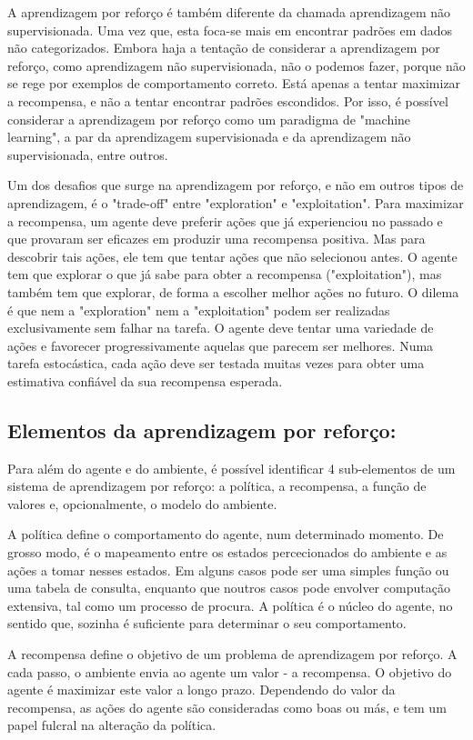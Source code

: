 A aprendizagem por reforço é também diferente da chamada aprendizagem não supervisionada. Uma vez que, esta foca-se mais em encontrar padrões em dados não categorizados. Embora haja a tentação de considerar a aprendizagem por reforço, como aprendizagem não supervisionada, não o podemos fazer, porque não se rege por exemplos de comportamento correto. Está apenas a tentar maximizar a recompensa, e não a tentar encontrar padrões escondidos.
Por isso, é possível considerar a aprendizagem por reforço como um paradigma de "machine learning", a par da aprendizagem supervisionada e da aprendizagem não supervisionada, entre outros.

Um dos desafios que surge na aprendizagem por reforço, e não em outros tipos de aprendizagem, é o "trade-off" entre "exploration" e "exploitation". Para maximizar a recompensa, um agente deve preferir ações que já experienciou no passado e que provaram  ser eficazes em produzir uma recompensa positiva. Mas para descobrir tais ações, ele tem que tentar ações que não selecionou antes. O agente tem que explorar o que já sabe para obter a recompensa ("exploitation"), mas também tem que explorar, de forma a escolher melhor ações no futuro. O dilema é que nem a "exploration" nem a "exploitation" podem ser realizadas exclusivamente sem falhar na tarefa. O agente deve tentar uma variedade de ações e favorecer progressivamente aquelas que parecem ser melhores. Numa tarefa estocástica, cada ação deve ser testada muitas vezes para obter uma estimativa confiável da sua recompensa esperada.

\subsection{Elementos da aprendizagem por reforço:}

Para além do agente e do ambiente, é possível identificar 4 sub-elementos de um sistema de aprendizagem por reforço: a política, a recompensa, a função de valores e, opcionalmente, o modelo do ambiente.

A política define o comportamento do agente, num determinado momento. De grosso modo, é o mapeamento entre os estados percecionados do ambiente e as ações a tomar nesses estados. Em alguns casos pode ser uma simples função ou uma tabela de consulta, enquanto que noutros casos pode envolver computação extensiva, tal como um processo de procura. A política é o núcleo do agente, no sentido que, sozinha é suficiente para determinar o seu comportamento.

A recompensa define o objetivo de um problema de aprendizagem por reforço. A cada passo, o ambiente envia ao agente um valor - a recompensa. O objetivo do agente é maximizar este valor a longo prazo. Dependendo do valor da recompensa, as ações do agente são consideradas como boas ou más, e tem um papel fulcral na alteração da política.

